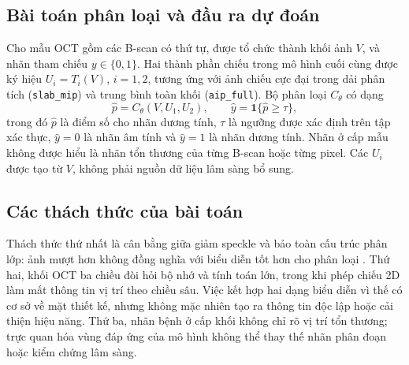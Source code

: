 \documentclass[14pt,a4paper,oneside]{extreport}
\begin{document}
%
%


\subsection{Bài toán phân loại và đầu ra dự đoán}
Cho mẫu OCT gồm các B-scan có thứ tự, được tổ chức thành khối ảnh
$V$, và nhãn tham chiếu $y\in\{0,1\}$. Hai thành phần chiếu trong
mô hình cuối cùng được ký hiệu $U_i=T_i(V)$, $i=1,2$, tương ứng với
ảnh chiếu cực đại trong dải phân tích (\texttt{slab\_mip}) và trung
bình toàn khối (\texttt{aip\_full}). Bộ phân loại $C_\theta$ có dạng
\begin{equation}
  \widehat p=C_\theta(V,U_1,U_2),\qquad
  \widehat y=\boldsymbol{1}\{\widehat p\geq\tau\},
  \label{eq:classification-task}
\end{equation}
trong đó $\widehat p$ là điểm số cho nhãn dương tính, $\tau$ là
ngưỡng được xác định trên tập xác thực, $\widehat y=0$ là nhãn âm tính và
$\widehat y=1$ là nhãn dương tính. Nhãn ở cấp mẫu không được hiểu
là nhãn tổn thương của từng B-scan hoặc từng pixel. Các $U_i$ được
tạo từ $V$, không phải nguồn dữ liệu lâm sàng bổ sung.

\subsection{Các thách thức của bài toán}
Thách thức thứ nhất là cân bằng giữa giảm speckle và bảo toàn cấu trúc
phân lớp: ảnh mượt hơn không đồng nghĩa với biểu diễn tốt hơn cho phân
loại \cite{aum2015}. Thứ hai, khối OCT ba chiều đòi hỏi bộ nhớ và tính
toán lớn, trong khi phép chiếu 2D làm mất thông tin vị trí theo chiều
sâu. Việc kết hợp hai dạng biểu diễn vì thế có cơ sở về mặt thiết kế,
nhưng không mặc nhiên tạo ra thông tin độc lập hoặc cải thiện hiệu năng.
Thứ ba, nhãn bệnh ở cấp khối không chỉ rõ vị trí tổn thương; trực quan
hóa vùng đáp ứng của mô hình không thể thay thế nhãn phân đoạn hoặc
kiểm chứng lâm sàng.
\end{document}
